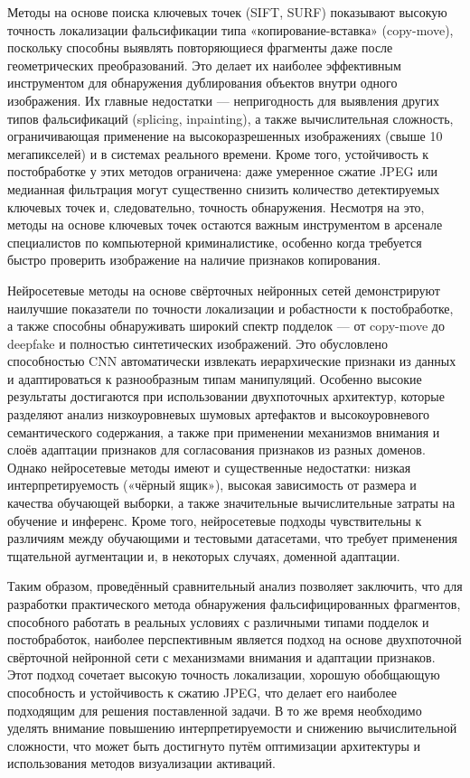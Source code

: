 Методы на основе поиска ключевых точек (SIFT, SURF) показывают высокую точность локализации фальсификации типа «копирование-вставка» (copy-move), поскольку способны выявлять повторяющиеся фрагменты даже после геометрических преобразований. Это делает их наиболее эффективным инструментом для обнаружения дублирования объектов внутри одного изображения. Их главные недостатки — непригодность для выявления других типов фальсификаций (splicing, inpainting), а также вычислительная сложность, ограничивающая применение на высокоразрешенных изображениях (свыше 10 мегапикселей) и в системах реального времени. Кроме того, устойчивость к постобработке у этих методов ограничена: даже умеренное сжатие JPEG или медианная фильтрация могут существенно снизить количество детектируемых ключевых точек и, следовательно, точность обнаружения. Несмотря на это, методы на основе ключевых точек остаются важным инструментом в арсенале специалистов по компьютерной криминалистике, особенно когда требуется быстро проверить изображение на наличие признаков копирования.

Нейросетевые методы на основе свёрточных нейронных сетей демонстрируют наилучшие показатели по точности локализации и робастности к постобработке, а также способны обнаруживать широкий спектр подделок — от copy-move до deepfake и полностью синтетических изображений. Это обусловлено способностью CNN автоматически извлекать иерархические признаки из данных и адаптироваться к разнообразным типам манипуляций. Особенно высокие результаты достигаются при использовании двухпоточных архитектур, которые разделяют анализ низкоуровневых шумовых артефактов и высокоуровневого семантического содержания, а также при применении механизмов внимания и слоёв адаптации признаков для согласования признаков из разных доменов. Однако нейросетевые методы имеют и существенные недостатки: низкая интерпретируемость («чёрный ящик»), высокая зависимость от размера и качества обучающей выборки, а также значительные вычислительные затраты на обучение и инференс. Кроме того, нейросетевые подходы чувствительны к различиям между обучающими и тестовыми датасетами, что требует применения тщательной аугментации и, в некоторых случаях, доменной адаптации.

Таким образом, проведённый сравнительный анализ позволяет заключить, что для разработки практического метода обнаружения фальсифицированных фрагментов, способного работать в реальных условиях с различными типами подделок и постобработок, наиболее перспективным является подход на основе двухпоточной свёрточной нейронной сети с механизмами внимания и адаптации признаков. Этот подход сочетает высокую точность локализации, хорошую обобщающую способность и устойчивость к сжатию JPEG, что делает его наиболее подходящим для решения поставленной задачи. В то же время необходимо уделять внимание повышению интерпретируемости и снижению вычислительной сложности, что может быть достигнуто путём оптимизации архитектуры и использования методов визуализации активаций.

